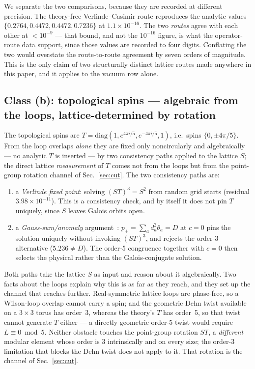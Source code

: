 \documentclass[aps,pra,twocolumn,superscriptaddress,longbibliography,floatfix,nofootinbib]{revtex4-2}
\begin{document}
We separate the two comparisons, because they are recorded at different
precision. The theory-free Verlinde--Casimir route reproduces the analytic
values $\{0.2764,0.4472,0.4472,0.7236\}$ at $1.1\times10^{-16}$. The two
\emph{routes} agree with each other at $<10^{-9}$ --- that bound, and not the
$10^{-16}$ figure, is what the operator-route data support, since those values
are recorded to four digits. Conflating the two would overstate the
route-to-route agreement by seven orders of magnitude. This is the only claim
of two structurally distinct lattice routes made anywhere in this paper, and it
applies to the vacuum row alone.

\subsection{Class (b): topological spins --- algebraic from the loops,
lattice-determined by rotation}
\label{sec:classb}

The topological spins are
$T=\mathrm{diag}(1,e^{4\pi i/5},e^{-4\pi i/5},1)$, i.e.\ spins
$\{0,\pm4\pi/5\}$. From the loop overlaps \emph{alone} they are fixed only
noncircularly and algebraically --- no analytic $T$ is inserted --- by two
consistency paths applied to the lattice $S$; the direct lattice
\emph{measurement} of $T$ comes not from the loops but from the point-group
rotation channel of Sec.~\ref{sec:cut}. The two consistency paths are:

\begin{enumerate}
\item[(b1)] a \emph{Verlinde fixed point}: solving $(ST)^{3}=S^{2}$ from random
grid starts (residual $3.98\times10^{-11}$). This is a consistency check, and
by itself it does not pin $T$ uniquely, since $S$ leaves Galois orbits open.
\item[(b2)] a \emph{Gauss-sum/anomaly} argument~\cite{Vafa1988,Bantay1997}:
$p_{+}=\sum_a d_a^{2}\theta_a = D$ at $c=0$ pins the solution uniquely without
invoking $(ST)^{3}$, and rejects the order-3 alternative ($5.236 \ne D$). The
order-5 congruence together with $c=0$ then selects the physical rather than
the Galois-conjugate solution.
\end{enumerate}

Both paths take the lattice $S$ as input and reason about it algebraically. Two
facts about the loops explain why this is as far as they reach, and they set up
the channel that reaches further. Real-symmetric lattice loops are phase-free,
so a Wilson-loop overlap cannot carry a spin; and the geometric Dehn twist
available on a $3\times3$ torus has order~3, whereas the theory's $T$ has
order~5, so that twist cannot generate $T$ either --- a directly geometric
order-5 twist would require $L\equiv0\bmod5$. Neither obstacle touches the
point-group rotation $ST$, a \emph{different} modular element whose order is $3$
intrinsically and on every size; the order-3 limitation that blocks the Dehn
twist does not apply to it. That rotation is the channel of Sec.~\ref{sec:cut}.
\end{document}
